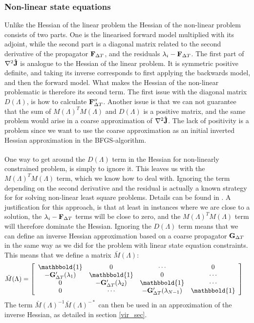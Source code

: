 \subsubsection{Non-linear state equations}
Unlike the Hessian of the linear problem the Hessian of the non-linear problem consists of two parts. One is the linearised forward model multiplied with its adjoint, while the second part is a diagonal matrix related to the second derivative of the propagator $\bold F_{\Delta T}$, and the residuals $\lambda_i-\bold F_{\Delta T}$. The first part of $\nabla^2 \bold{\hat{J}}$ is analogue to the Hessian of the linear problem. It is symmetric positive definite, and taking its inverse corresponds to first applying the backwards model, and then the forward model. What makes the Hessian of the non-linear problematic is therefore its second term. The first issue with the diagonal matrix $D(\Lambda)$, is how to calculate $\bold F_{\Delta T}''$. Another issue is that we can not guarantee that the sum of $M(\Lambda)^TM(\Lambda)$ and $D(\Lambda)$ is a positive matrix, and the same problem would arise in a coarse approximation of $\nabla^2 \bold{\hat{J}}$. The lack of positivity is a problem since we want to use the coarse approximation as an initial inverted Hessian approximation in the BFGS-algorithm.
\\
\\
One way to get around the $D(\Lambda)$ term in the Hessian for non-linearly constrained problem, is simply to ignore it. This leaves us with the $M(\Lambda)^TM(\Lambda)$ term, which we know how to deal with. Ignoring the term depending on the second derivative and the residual is actually a known strategy for for solving non-linear least square problems. Details can be found in \cite{nocedal2006numerical}. A justification for this approach, is that at least in instances where we are close to a solution, the $\lambda_i-\bold F_{\Delta T}$ terms will be close to zero, and the $M(\Lambda)^TM(\Lambda)$ term will therefore dominate the Hessian. Ignoring the $D(\Lambda)$ term means that we can define an inverse Hessian approximation based on a coarse propagator $\bold G_{\Delta T}$ in the same way as we did for the problem with linear state equation constraints. This means that we define a matrix $\bar M(\Lambda)$:
\begin{align}
\bar M(\Lambda) &= \left[ \begin{array}{cccc}
   \mathbbold{1} & 0 & \cdots & 0 \\  
   -\bold{G}_{\Delta T}'(\lambda_{1}) & \mathbbold{1} & 0 & \cdots \\ 
   0 &-\bold{G}_{\Delta T}'(\lambda_{2}) & \mathbbold{1}  & \cdots \\
   0 &\cdots &-\bold{G}_{\Delta T}'(\lambda_{N-1}) & \mathbbold{1}  \\
   \end{array}  \right] \label{ppc_linearized}
\end{align}
The term $\bar{M}(\Lambda)^{-1}\bar{M}(\Lambda)^{-*}$ can then be used in an approximation of the inverse Hessian, as detailed in section \ref{vir_sec}.
